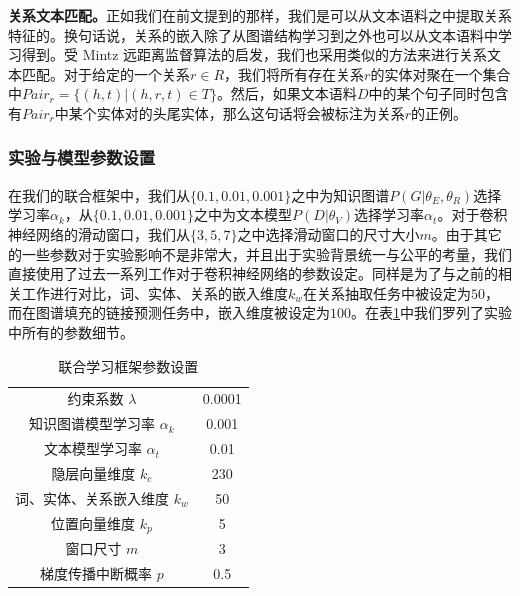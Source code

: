 \textbf{关系文本匹配。}正如我们在前文提到的那样，我们是可以从文本语料之中提取关系特征的。换句话说，关系的嵌入除了从图谱结构学习到之外也可以从文本语料中学习得到。受 Mintz \cite{mintz2009distant} 远距离监督算法的启发，我们也采用类似的方法来进行关系文本匹配。对于给定的一个关系$r \in R$，我们将所有存在关系$r$的实体对聚在一个集合中$Pair_{r} = \{(h, t) | (h, r, t) \in T \}$。然后，如果文本语料$D$中的某个句子同时包含有$Pair_{r}$中某个实体对的头尾实体，那么这句话将会被标注为关系$r$的正例。

\subsubsection{实验与模型参数设置}

在我们的联合框架中，我们从$\{0.1, 0.01, 0.001\}$之中为知识图谱$P(G|{\theta_E,\theta_R})$选择学习率$\alpha_k$，从$\{0.1, 0.01, 0.001\}$之中为文本模型$P(D|{\theta_V})$选择学习率$\alpha_t$。对于卷积神经网络的滑动窗口，我们从$\{3,5,7\}$之中选择滑动窗口的尺寸大小$m$。由于其它的一些参数对于实验影响不是非常大，并且出于实验背景统一与公平的考量，我们直接使用了过去一系列工作\cite{zeng2014relation,lin2016neural}对于卷积神经网络的参数设定。同样是为了与之前的相关工作进行对比，词、实体、关系的嵌入维度$k_w$在关系抽取任务中被设定为$50$，而在图谱填充的链接预测任务中，嵌入维度被设定为$100$。在表\ref{tab3:parameters}中我们罗列了实验中所有的参数细节。

\vspace{25pt}
\begin{table}[h]
\setlength{\abovecaptionskip}{30pt} 
\centering
\caption{联合学习框架参数设置}
\begin{tabular}{cc}
      \toprule[1.5pt]

\multicolumn{1}{c}{约束系数 $\lambda$}                & 0.0001 \\
\multicolumn{1}{c}{知识图谱模型学习率 $\alpha_k$}        & 0.001 \\
\multicolumn{1}{c}{文本模型学习率 $\alpha_t$}             & 0.01  \\
\multicolumn{1}{c}{隐层向量维度 $k_c$}        & 230   \\
\multicolumn{1}{c}{词、实体、关系嵌入维度 $k_w$} & 50    \\
\multicolumn{1}{c}{位置向量维度 $k_p$}            & 5     \\
\multicolumn{1}{c}{窗口尺寸 $m$}    & 3     \\
\multicolumn{1}{c}{梯度传播中断概率 $p$}            & 0.5  \\
      \bottomrule[1.5pt]

\end{tabular}
\label{tab3:parameters}
\end{table}



